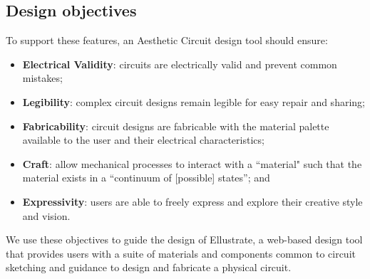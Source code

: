 \documentclass{sigchi}
\begin{document}
\subsection{Design objectives}
  To support these features, an Aesthetic Circuit design tool should ensure:
    \begin{itemize}
        \item {\bf Electrical Validity}: circuits are electrically valid and prevent common mistakes;
        \item {\bf Legibility}: complex circuit designs remain legible for easy repair and sharing;
        \item {\bf Fabricability}: circuit designs are fabricable with the material palette available to the user and their electrical characteristics;
        \item {\bf Craft}: allow mechanical processes to interact with a ``material"   such that the material exists in a ``continuum of [possible] states''\cite{mccullough1998abstracting}; and
        \item {\bf Expressivity}: users are able to freely express and explore their creative style and vision. 
    \end{itemize}
We use these objectives to guide the design of Ellustrate, a web-based design tool that provides users with a suite of materials and components common to circuit sketching and guidance to design and fabricate a physical circuit.
\end{document}

